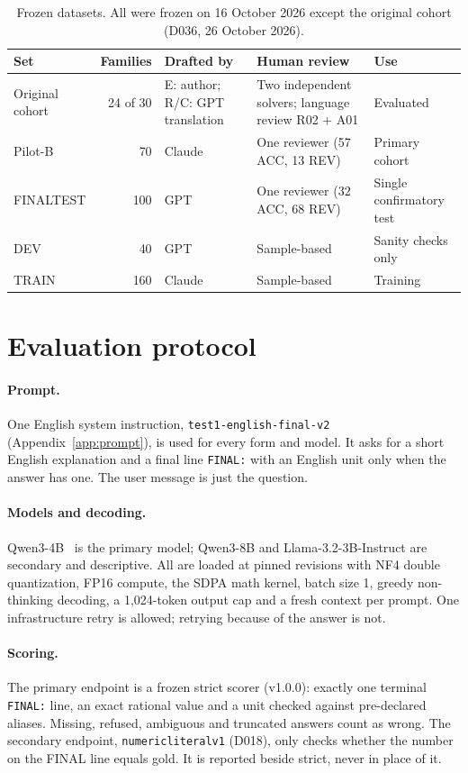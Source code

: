 \documentclass[12pt,a4paper,oneside]{report}
\renewcommand{\_}{\oldunderscore\allowbreak}
\begin{document}
\begin{table}[t]
\centering\small
\caption{Frozen datasets. All were frozen on 16 October 2026 except the original cohort (D036, 26 October 2026).}
\label{tab:datasets}
\begin{tabularx}{\linewidth}{@{}p{2.2cm}rp{2.4cm}p{3.6cm}L@{}}
\toprule
Set & Families & Drafted by & Human review & Use\\
\midrule
Original cohort & 24 of 30 & E: author; R/C: GPT translation & Two independent solvers; language review R02 + A01 & Evaluated\\
Pilot-B & 70 & Claude & One reviewer (57 ACC, 13 REV) & Primary cohort\\
FINAL\_TEST & 100 & GPT & One reviewer (32 ACC, 68 REV) & Single confirmatory test\\
DEV & 40 & GPT & Sample-based & Sanity checks only\\
TRAIN & 160 & Claude & Sample-based & Training\\
\bottomrule
\end{tabularx}
\end{table}

\section{Evaluation protocol}
\label{sec:protocol}

\paragraph{Prompt.} One English system instruction, \texttt{test1-english-final-v2} (Appendix~\ref{app:prompt}), is used for every form and model. It asks for a short English explanation and a final line \texttt{FINAL:} with an English unit only when the answer has one. The user message is just the question.

\paragraph{Models and decoding.} Qwen3-4B~\citep{qwen3-2025} is the primary model; Qwen3-8B and Llama-3.2-3B-Instruct are secondary and descriptive. All are loaded at pinned revisions with NF4 double quantization, FP16 compute, the SDPA math kernel, batch size 1, greedy non-thinking decoding, a 1,024-token output cap and a fresh context per prompt. One infrastructure retry is allowed; retrying because of the answer is not.

\paragraph{Scoring.} The primary endpoint is a frozen strict scorer (v1.0.0): exactly one terminal \texttt{FINAL:} line, an exact rational value and a unit checked against pre-declared aliases. Missing, refused, ambiguous and truncated answers count as wrong. The secondary endpoint, \texttt{numeric\_literal\_v1} (D018), only checks whether the number on the FINAL line equals gold. It is reported beside strict, never in place of it.
\end{document}
